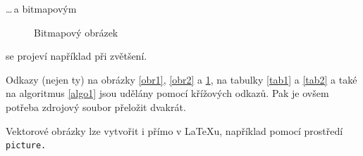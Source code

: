 \documentclass[a4paper, 11pt]{article}
\begin{document}
  \bigskip
  \noindent \dots\,a bitmapovým

  \begin{figure}[h]
    \centering
    \caption{Bitmapový obrázek}
    \label{obr3}
  \end{figure}

  \bigskip
  \noindent se projeví například při zvětšení.

  Odkazy (nejen ty) na obrázky \ref{obr1}, \ref{obr2} a \ref{obr3}, na tabulky 
  \ref{tab1} a \ref{tab2} a také na 
  algoritmus \ref{algo1} jsou udělány pomocí křížových odkazů. Pak je ovšem
  potřeba zdrojový soubor přeložit dvakrát.

  Vektorové obrázky lze vytvořit i přímo v \LaTeX{u}, například pomocí
  prostředí\texttt{ picture.}

  \newpage
\end{document}

